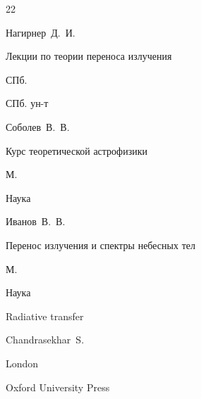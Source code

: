 







\RusRef



\begin{thebibliography}{22}




\by Нагирнер~Д.~И.

\book Лекции по теории переноса излучения

\publaddr СПб.

\publ СПб. ун-т










\by Соболев~В.~В.

\book Курс теоретической астрофизики

\publaddr М.

\publ Наука








\by Иванов~В.~В.

\book Перенос излучения и спектры небесных тел

\publaddr М.

\publ Наука








\book Radiative transfer

\by Chandrasekhar~S.

\publaddr London 

\publ Oxford University Press






\end{thebibliography}
